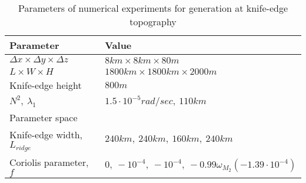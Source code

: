 \documentclass[12pt]{article}
\begin{document}
\begin{table}
	\caption{Parameters of numerical experiments for generation at knife-edge topography}
	\begin{tabular}{ |p{7cm}||p{7cm}|  }
		\hline
		Parameter & Value \\
		\hline
		$\Delta x \times \Delta y \times \Delta z$ & $8km \times 8km \times 80m$ \\
		$L \times W \times H$ & $1800km \times 1800km \times 2000m$ \\
		Knife-edge height & $800m$ \\
		$N^2,~\lambda_1$ & $1.5\cdot 10^{-5}rad/sec,~110km$ \\
		\hline
		\multicolumn{2}{|l|}{Parameter space} \\
		\hline
		Knife-edge width, $L_{ridge}$ & $240km,~240km,~160km,~240km$ \\
		Coriolis parameter, $f$ & $0,~\minus 10^{\minus4},~\minus 10^{\minus4},~\minus 0.99 
		\omega_{M_2}(\minus1.39\cdot10^{\minus4})$ \\
		\hline
	\end{tabular}
	\label{C3:tab.gen.prms}
\end{table}

\end{document}

